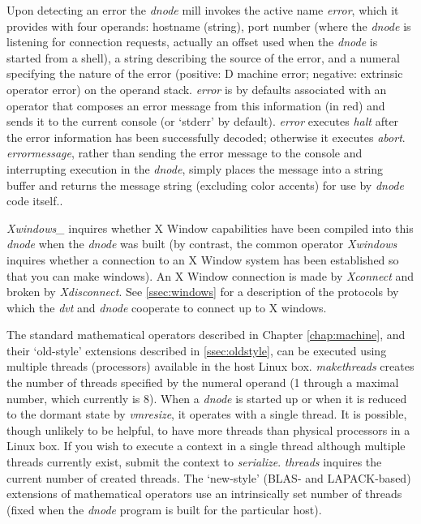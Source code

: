 Upon detecting an error the \emph{dnode} mill invokes the active name \emph{error}, which it provides with four operands: hostname (string), port number (where the \emph{dnode} is listening for connection requests, actually an offset used when the \emph{dnode} is started from a shell), a string describing the source of the error, and a numeral specifying the nature of the error (positive: D machine error; negative: extrinsic operator error) on the operand stack. \emph{error} is by defaults associated with an operator that composes an error message from this information (in red) and sends it to the current console (or `stderr' by default). \emph{error} executes \emph{halt} after the error information has been successfully decoded; otherwise it executes \emph{abort}. \emph{errormessage}, rather than sending the error message to the console and interrupting execution in the \emph{dnode}, simply places the message into a string buffer and returns the message string (excluding color accents) for use by \emph{dnode} code itself..

\emph{Xwindows\_} inquires whether X Window capabilities have been compiled into this \emph{dnode} when the \emph{dnode} was built (by contrast, the common operator \emph{Xwindows} inquires whether a connection to an X Window system has been established so that you can make windows). An X Window connection is made by \emph{Xconnect} and broken by \emph{Xdisconnect}. See \ref{ssec:windows} for a description of the protocols by which the \emph{dvt} and \emph{dnode} cooperate to connect up to X windows.

The standard mathematical operators described in Chapter \ref{chap:machine}, and their `old-style' extensions described in \ref{ssec:oldstyle}, can be executed using multiple threads (processors) available in the host Linux box. \emph{makethreads} creates the number of threads specified by the numeral operand (1 through a maximal number, which currently is 8). When a \emph{dnode} is started up or when it is reduced to the dormant state by \emph{vmresize}, it operates with a single thread. It is possible, though unlikely to be helpful, to have more threads than physical processors in a Linux box. If you wish to execute a context in a single thread although multiple threads currently exist, submit the context to \emph{serialize}. \emph{threads} inquires the current number of created threads. The `new-style' (BLAS- and LAPACK-based) extensions of mathematical operators use an intrinsically set number of threads (fixed when the \emph{dnode} program is built for the particular host).


